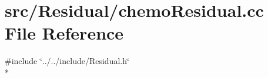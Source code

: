 \section{src/\-Residual/chemo\-Residual.cc File Reference}
\label{chemo_residual_8cc}
{\ttfamily \#include \char`\"{}../../include/\-Residual.\-h\char`\"{}}\\*
